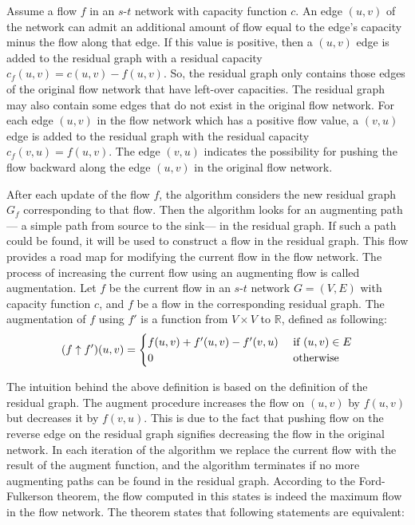 \documentclass{llncs}
\begin{document}
Assume a flow $f$ in an $s$-$t$ network with capacity function $c$. An edge $(u, v)$ of the network can admit an additional amount of flow equal to the edge’s capacity minus the flow along that edge. If this value is positive, then a $(u, v)$ edge is added to the residual graph with a residual capacity $c_f (u, v) = c (u, v) - f (u, v)$. So, the residual graph only contains those edges of the original flow network that have left-over capacities. The residual graph may also contain some edges that do not exist in the original flow network. For each edge $(u, v)$ in the flow network which has a positive flow value, a $(v, u)$ edge is added to the residual graph with the residual capacity $c_f (v, u) = f (u, v)$. The edge $(v, u)$ indicates the possibility for pushing the flow backward along the edge $(u, v)$ in the original flow network.

After each update of the flow $f$, the algorithm considers the new residual graph $G_f$ corresponding to that flow. Then the algorithm looks for an augmenting path--- a simple path from source to the sink--- in the residual graph. If such a path could be found, it will be used to construct a flow in the residual graph. This flow provides a road map for modifying the current flow in the flow network. The process of increasing the current flow using an augmenting flow is called augmentation. Let $f$ be the current flow in an $s$-$t$ network $G = (V, E)$ with capacity function $c$, and $f$ be a flow in the corresponding residual graph. The augmentation of $f$ using $f'$ is a function from $V \times V$ to $\mathbb{R}$, defined as following:
\[ (f \uparrow f') (u, v) = 
	\begin{cases}
	f (u, v) + f'(u, v) - f'(v, u) \hfill & \text{ if $(u, v) \in E$} \\	
	0 \hfill & \text{ otherwise} \\
	\end{cases} 
\]

The intuition behind the above definition is based on the definition of the residual graph. The augment procedure increases the flow on $(u, v)$ by $f ( u, v )$ but decreases it by $f (v, u)$. This is due to the fact that pushing flow on the reverse edge on the residual graph signifies decreasing the flow in the original network. In each iteration of the algorithm we replace the current flow with the result of the augment function, and the algorithm terminates if no more augmenting paths can be found in the residual graph. According to the Ford-Fulkerson theorem, the flow computed in this states is indeed the maximum flow in the flow network. The theorem states that following statements are equivalent:
\end{document}
